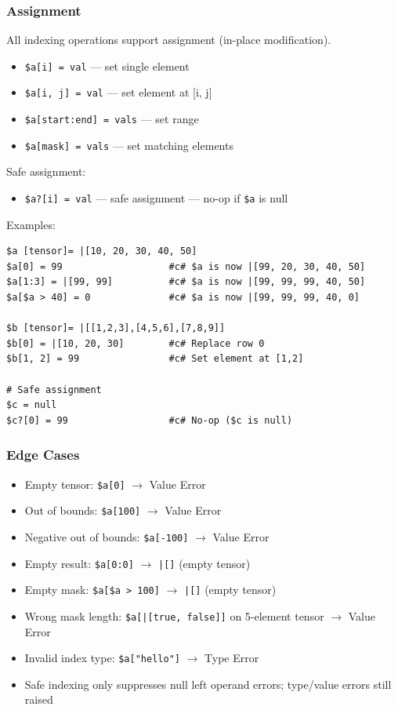 \subsubsection{Assignment}
All indexing operations support assignment (in-place modification).
\begin{itemize}
\item \texttt{\$a[i] = val} --- set single element
\item \texttt{\$a[i, j] = val} --- set element at [i, j]
\item \texttt{\$a[start:end] = vals} --- set range
\item \texttt{\$a[mask] = vals} --- set matching elements
\end{itemize}

Safe assignment:
\begin{itemize}
\item \texttt{\$a?[i] = val} --- safe assignment --- no-op if \texttt{\$a} is null
\end{itemize}

Examples:
\begin{verbatim}
$a [tensor]= |[10, 20, 30, 40, 50]
$a[0] = 99                   #c# $a is now |[99, 20, 30, 40, 50]
$a[1:3] = |[99, 99]          #c# $a is now |[99, 99, 99, 40, 50]
$a[$a > 40] = 0              #c# $a is now |[99, 99, 99, 40, 0]

$b [tensor]= |[[1,2,3],[4,5,6],[7,8,9]]
$b[0] = |[10, 20, 30]        #c# Replace row 0
$b[1, 2] = 99                #c# Set element at [1,2]

# Safe assignment
$c = null
$c?[0] = 99                  #c# No-op ($c is null)
\end{verbatim}

\subsubsection{Edge Cases}
\begin{itemize}
\item Empty tensor: \texttt{\$a[0]} $\rightarrow$ Value Error
\item Out of bounds: \texttt{\$a[100]} $\rightarrow$ Value Error
\item Negative out of bounds: \texttt{\$a[-100]} $\rightarrow$ Value Error
\item Empty result: \texttt{\$a[0:0]} $\rightarrow$ \texttt{|[]} (empty tensor)
\item Empty mask: \texttt{\$a[\$a > 100]} $\rightarrow$ \texttt{|[]} (empty tensor)
\item Wrong mask length: \texttt{\$a[|[true, false]]} on 5-element tensor $\rightarrow$ Value Error
\item Invalid index type: \texttt{\$a["hello"]} $\rightarrow$ Type Error
\item Safe indexing only suppresses null left operand errors; type/value errors still raised
\end{itemize}

